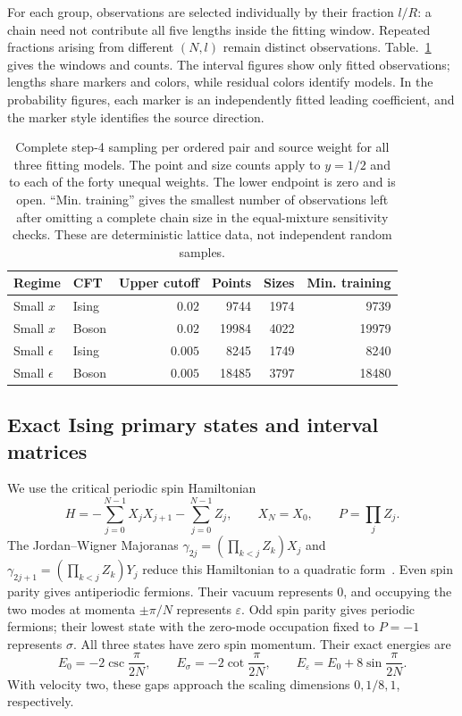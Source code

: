 \documentclass[11pt]{article}
\newcommand{\ep}{\epsilon}
\begin{document}
For each group, observations are selected individually by their
fraction $l/R$: a chain need not contribute all five lengths
inside the fitting window. Repeated fractions arising from
different $(N,l)$ remain distinct observations.
Table.~\ref{tab:num-windows} gives the windows and counts.
The interval figures show only fitted observations; lengths share
markers and colors, while residual colors identify models. In the
probability figures, each marker is an independently fitted leading
coefficient, and the marker style identifies the source direction.
\begin{table}[htbp]\centering\small
\begin{tabular}{llrrrr}\toprule
Regime & CFT & Upper cutoff & Points & Sizes & Min. training\\\midrule
Small $x$ & Ising & $0.02$ & 9744 & 1974 & 9739\\
Small $x$ & Boson & $0.02$ & 19984 & 4022 & 19979\\
Small $\ep$ & Ising & $0.005$ & 8245 & 1749 & 8240\\
Small $\ep$ & Boson & $0.005$ & 18485 & 3797 & 18480\\\bottomrule
\end{tabular}
\caption{Complete step-4 sampling per ordered pair and source weight
for all three fitting models. The point and size counts apply to
$y=1/2$ and to each of the forty unequal weights. The lower
endpoint is zero and is open. ``Min. training'' gives the smallest
number of observations left after omitting a complete chain size
in the equal-mixture sensitivity checks. These are deterministic lattice data, not independent
random samples.}
\label{tab:num-windows}
\end{table}

\subsection{Exact Ising primary states and interval matrices}
\label{app:num-ising}
We use the critical periodic spin Hamiltonian
\begin{equation}
 H=-\sum_{j=0}^{N-1}X_jX_{j+1}-\sum_{j=0}^{N-1}Z_j,
 \qquad X_N=X_0,\qquad P=\prod_j Z_j.
 \label{eq:num-ising-H}
\end{equation}
The Jordan--Wigner Majoranas
$\gamma_{2j}=(\prod_{k<j}Z_k)X_j$ and
$\gamma_{2j+1}=(\prod_{k<j}Z_k)Y_j$ reduce this Hamiltonian
to a quadratic form~\cite{numMontes2017,numPeschelEisler}.
Even spin parity gives antiperiodic fermions. Their vacuum
represents $0$, and occupying the two modes at momenta
$\pm\pi/N$ represents $\varepsilon$. Odd spin parity gives
periodic fermions; their lowest state with the zero-mode
occupation fixed to $P=-1$ represents $\sigma$. All three
states have zero spin momentum. Their exact energies are
\begin{equation}
 E_0=-2\csc\frac{\pi}{2N},\qquad
 E_\sigma=-2\cot\frac{\pi}{2N},\qquad
 E_\varepsilon=E_0+8\sin\frac{\pi}{2N}.
 \label{eq:num-ising-energies}
\end{equation}
With velocity two, these gaps approach the scaling dimensions
$0,1/8,1$, respectively.
\end{document}
